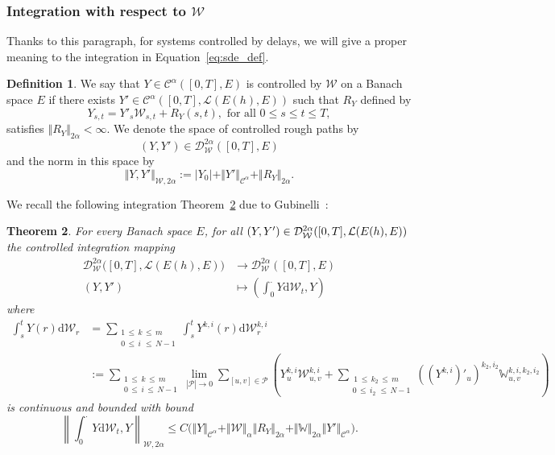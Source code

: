 \documentclass[11pt]{article}
\newtheorem{theo}{Theorem}[section]
\theoremstyle{definition}
\newtheorem{defi}[theo]{Definition}
\numberwithin{equation}{section}
\numberwithin{figure}{section}
\numberwithin{table}{section}
\newcommand{\alp}{\alpha}%
\newcommand*\W{\mathbb{W}}
\newcommand*\Cc{\mathcal{C}}
\newcommand*\Dc{\mathcal{D}}
\newcommand*\Lc{\mathcal{L}}
\newcommand*\Pc{\mathcal{P}}
\newcommand*\Wc{\mathcal{W}}
\newcommand*{\dd}{\mathrm{d}}
\newcommand*{\dWc}{\dd \Wc}
\begin{document}
\subsubsection{Integration with respect to \texorpdfstring{$\Wc$}{W}}
Thanks to this paragraph, for systems controlled by delays, we will give a proper meaning to the integration in Equation~\eqref{eq:sde_def}.

\begin{defi}\label{def-controlled}
We say that $Y\in \Cc^\alp ([0,T], E)$ is controlled by $\Wc$ on a Banach space $E$ if there exists $Y'\in \Cc^\alp ([0,T], \Lc(E(h),E))$ such that $R_Y$ defined by
\begin{equation}\label{controlled}
Y_{s,t}= Y'_s \Wc_{s,t} + R_Y(s,t),\text{ for all }0\leq s\leq t\leq T,
\end{equation}
satisfies $\Vert R_Y \Vert_{2\alpha}<\infty$. We denote the space of controlled rough paths by
\[
(Y,Y')\in \Dc_\Wc^{2\alpha} ([0,T], E)
\]
and the norm in this space by
\[
\Vert Y,Y'\Vert_{\Wc,2\alpha}:=|Y_0|+\Vert Y'\Vert_{\Cc^\alpha}+ \Vert R_Y\Vert_{2\alpha}.
\]
\end{defi}

We recall the following integration Theorem~\ref{thm:continuity_integration} due to Gubinelli~\cite[Theorem~4.10]{FH14}:
\begin{theo}\label{thm:continuity_integration}
For every Banach space $E$, for all $(Y,Y')\in \Dc_{\Wc}^{2\alp} ([0,T], \Lc(E(h),\linebreak E))$ the controlled integration mapping
\begin{align*}
\Dc_{\Wc}^{2\alp} \big([0,T], \Lc(E(h),E) \big)  &\longrightarrow\Dc_{\Wc}^{2\alp} \left([0,T], E \right)\\
(Y,Y')&\longmapsto\left(\int_0^\cdot Y\dWc_t,Y\right)
\end{align*}
where
\begin{align*}
\int_s^t Y(r) \dWc_r &=\sum_{ \substack{1\,\leq\,k\,\leq\,m \\
0\,\leq\,i\,\,\leq\,N-1}}
\int_s^t Y^{k,i}(r) \dWc^{k,i}_r
\\
&\!:= \sum_{ \substack{1\,\leq\,k\,\leq\,m\\
0\,\leq\,i\,\leq\,N-1}}
\lim_{|\Pc|\to 0}\sum_{[u,v]\in\Pc}\left(Y^{k,i}_u \Wc_{u,v}^{k,i}+\sum_{\substack{\,1\,\leq\,k_2\,\leq\,m \\
0\,\leq\,i_2\,\,\leq\,N-1}}\! ((Y^{k,i})'_u)^{k_2,i_2} \W_{u,v}^{k,i,k_2,i_2}\right)
\end{align*}
is continuous and bounded with bound
\[
\left\lVert \int_0^\cdot Y\dWc_t,Y \right\rVert_{\Wc,2\alpha}
\leq C\big(\Vert Y\Vert_{\Cc^\alp} + \Vert \Wc\Vert_\alp\Vert R_Y\Vert_{2\alp}+\Vert \W\Vert_{2\alp} \Vert Y'\Vert_{\Cc^\alp}
\big) .
\]
\end{theo}
\end{document}
